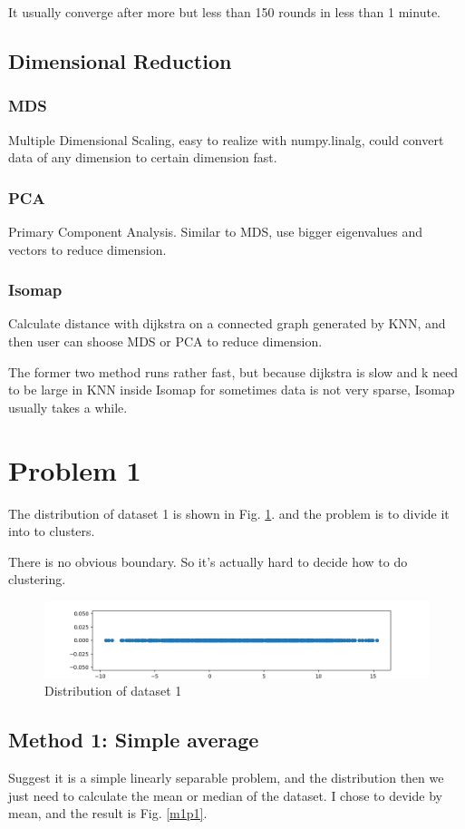 \documentclass[conference]{IEEEtran}
\begin{document}
It usually converge after more but less than 150 rounds in less than 1 minute.

\subsection{\textbf{Dimensional Reduction}}
\subsubsection{\textbf{MDS}}
Multiple Dimensional Scaling, easy to realize with numpy.linalg, could convert data of any dimension to certain dimension fast.
\subsubsection{\textbf{PCA}}
Primary Component Analysis. Similar to MDS, use bigger eigenvalues and vectors to reduce dimension.
\subsubsection{\textbf{Isomap}}
Calculate distance with dijkstra on a connected graph generated by KNN, and then user can shoose MDS or PCA to reduce dimension.

The former two method runs rather fast, but because dijkstra is slow and k need to be large in KNN inside Isomap for sometimes data is not very sparse, Isomap usually takes a while.


\section{\textbf{Problem 1}}
The distribution of dataset 1 is shown in Fig. \ref{p1raw}. and the problem is to divide it into to clusters.

There is no obvious boundary. So it's actually hard to decide how to do clustering.

\begin{figure}[htbp]
	\centerline{\includegraphics[scale=0.375]{p1raw.png}}
	\caption{Distribution of dataset 1}
	\label{p1raw}
\end{figure}

\subsection{Method 1: Simple average}
Suggest it is a simple linearly separable problem, and the distribution then we just need to calculate the mean or median of the dataset. I chose to devide by mean, and the result is Fig. \ref{m1p1}.
\end{document}
